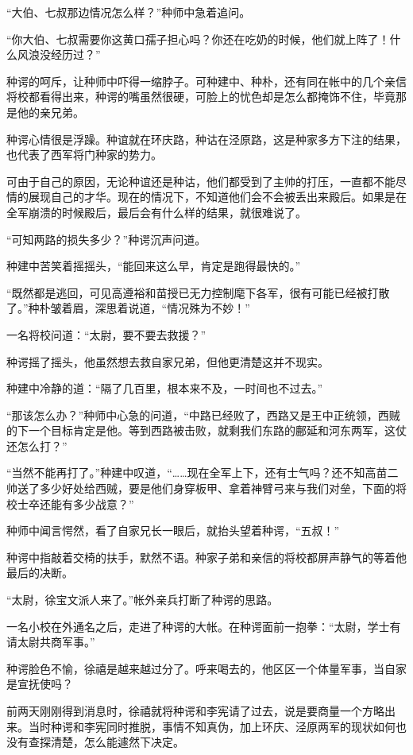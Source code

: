 “大伯、七叔那边情况怎么样？”种师中急着追问。

“你大伯、七叔需要你这黄口孺子担心吗？你还在吃奶的时候，他们就上阵了！什么风浪没经历过？”

种谔的呵斥，让种师中吓得一缩脖子。可种建中、种朴，还有同在帐中的几个亲信将校都看得出来，种谔的嘴虽然很硬，可脸上的忧色却是怎么都掩饰不住，毕竟那是他的亲兄弟。

种谔心情很是浮躁。种谊就在环庆路，种诂在泾原路，这是种家多方下注的结果，也代表了西军将门种家的势力。

可由于自己的原因，无论种谊还是种诂，他们都受到了主帅的打压，一直都不能尽情的展现自己的才华。现在的情况下，不知道他们会不会被丢出来殿后。如果是在全军崩溃的时候殿后，最后会有什么样的结果，就很难说了。

“可知两路的损失多少？”种谔沉声问道。

种建中苦笑着摇摇头，“能回来这么早，肯定是跑得最快的。”

“既然都是逃回，可见高遵裕和苗授已无力控制麾下各军，很有可能已经被打散了。”种朴皱着眉，深思着说道，“情况殊为不妙！”

一名将校问道：“太尉，要不要去救援？”

种谔摇了摇头，他虽然想去救自家兄弟，但他更清楚这并不现实。

种建中冷静的道：“隔了几百里，根本来不及，一时间也不过去。”

“那该怎么办？”种师中心急的问道，“中路已经败了，西路又是王中正统领，西贼的下一个目标肯定是他。等到西路被击败，就剩我们东路的鄜延和河东两军，这仗还怎么打？”

“当然不能再打了。”种建中叹道，“……现在全军上下，还有士气吗？还不知高苗二帅送了多少好处给西贼，要是他们身穿板甲、拿着神臂弓来与我们对垒，下面的将校士卒还能有多少战意？”

种师中闻言愕然，看了自家兄长一眼后，就抬头望着种谔，“五叔！”

种谔中指敲着交椅的扶手，默然不语。种家子弟和亲信的将校都屏声静气的等着他最后的决断。

“太尉，徐宝文派人来了。”帐外亲兵打断了种谔的思路。

一名小校在外通名之后，走进了种谔的大帐。在种谔面前一抱拳：“太尉，学士有请太尉共商军事。”

种谔脸色不愉，徐禧是越来越过分了。呼来喝去的，他区区一个体量军事，当自家是宣抚使吗？

前两天刚刚得到消息时，徐禧就将种谔和李宪请了过去，说是要商量一个方略出来。当时种谔和李宪同时推脱，事情不知真伪，加上环庆、泾原两军的现状如何也没有查探清楚，怎么能遽然下决定。

